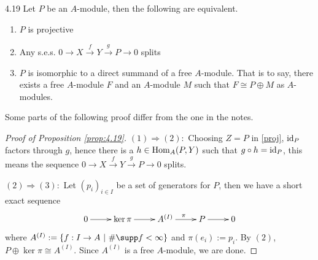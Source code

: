 \documentclass[twoside = false,	%
		headsepline,		%
		parskip = true,
		]{scrbook}						%
\begin{document}
    \begin{proposition}{}{4.19}
        Let $P$ be an $A$-module, then the following are equivalent.
        \begin{enumerate}
            \item $P$ is projective
            \item Any s.e.s. $0 \to X \xrightarrow{f} Y \xrightarrow{g} P \to 0$ splits
            \item $P$ is isomorphic to a direct summand of a free $A$-module. That is to say, there exists a free $A$-module $F$ and an $A$-module $M$ such that $F \cong P \oplus M$ as $A$-modules.
        \end{enumerate}
    \end{proposition}
    Some parts of the following proof differ from the one in the notes.
    \begin{proof}[Proof of Proposition \ref{prop:4.19}]
        
        $(1) \Rightarrow (2):$ Choosing $Z = P$ in \eqref{proj}, $\mathrm{id}_P$ factors through $g$, hence there is a $h \in \mathrm{Hom}_A(P,Y)$ such that $g \circ h = \mathrm{id}_P$, this means the sequence $0 \to X \xrightarrow{f} Y \xrightarrow{g} P \to 0$ splits.

        $(2) \Rightarrow (3):$ Let $(p_i)_{i \in I}$ be a set of generators for $P$, then we have a short exact sequence
        \begin{equation*}
        \xymatrix {
            0 \ar[r] & \ker \pi \ar[r] & A^{(I)} \ar[r]^{\pi} & P \ar[r] & 0
        }
        \end{equation*}
        where $A^{(I)}:=\{f: I \to A \ | \ \# \supp f < \infty \}$ and $\pi(e_i) := p_i$. By $(2)$, $P \oplus \ker \pi \cong A^{(I)}$. Since $A^{(I)}$ is a free $A$-module, we are done.


\end{proof}
\end{document}
